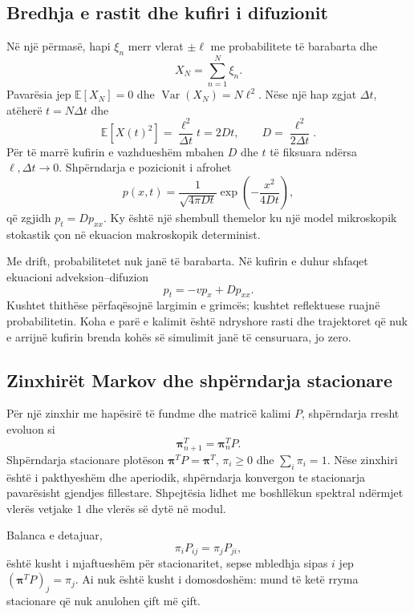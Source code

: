 \documentclass[11pt,oneside,openany]{book}
\newcommand{\vect}[1]{\bm{#1}}
\newcommand{\E}{\mathbb{E}}
\newcommand{\Var}{\operatorname{Var}}
\begin{document}
\subsection{Bredhja e rastit dhe kufiri i difuzionit}
Në një përmasë, hapi $\xi_n$ merr vlerat $\pm\ell$ me probabilitete të barabarta dhe
\begin{equation}
 X_N=\sum_{n=1}^{N}\xi_n.
\end{equation}
Pavarësia jep $\E[X_N]=0$ dhe $\Var(X_N)=N\ell^2$. Nëse një hap zgjat $\Delta t$, atëherë $t=N\Delta t$ dhe
\begin{equation}
 \E[X(t)^2]=\frac{\ell^2}{\Delta t}t=2Dt,
 \qquad D=\frac{\ell^2}{2\Delta t}.
\end{equation}
Për të marrë kufirin e vazhdueshëm mbahen $D$ dhe $t$ të fiksuara ndërsa $\ell,\Delta t\to0$. Shpërndarja e pozicionit i afrohet
\begin{equation}
 p(x,t)=\frac{1}{\sqrt{4\pi Dt}}\exp\left(-\frac{x^2}{4Dt}\right),
\end{equation}
që zgjidh $p_t=Dp_{xx}$. Ky është një shembull themelor ku një model mikroskopik stokastik çon në ekuacion makroskopik determinist.

Me drift, probabilitetet nuk janë të barabarta. Në kufirin e duhur shfaqet ekuacioni adveksion--difuzion
\begin{equation}
 p_t=-v p_x+Dp_{xx}.
\end{equation}
Kushtet thithëse përfaqësojnë largimin e grimcës; kushtet reflektuese ruajnë probabilitetin. Koha e parë e kalimit është ndryshore rasti dhe trajektoret që nuk e arrijnë kufirin brenda kohës së simulimit janë të censuruara, jo zero.

\subsection{Zinxhirët Markov dhe shpërndarja stacionare}
Për një zinxhir me hapësirë të fundme dhe matricë kalimi $P$, shpërndarja rresht evoluon si
\begin{equation}
 \vect\pi_{n+1}^T=\vect\pi_n^TP.
\end{equation}
Shpërndarja stacionare plotëson $\vect\pi^TP=\vect\pi^T$, $\pi_i\ge0$ dhe $\sum_i\pi_i=1$. Nëse zinxhiri është i pakthyeshëm dhe aperiodik, shpërndarja konvergon te stacionarja pavarësisht gjendjes fillestare. Shpejtësia lidhet me boshllëkun spektral ndërmjet vlerës vetjake $1$ dhe vlerës së dytë në modul.

Balanca e detajuar,
\begin{equation}
 \pi_iP_{ij}=\pi_jP_{ji},
\end{equation}
është kusht i mjaftueshëm për stacionaritet, sepse mbledhja sipas $i$ jep $(\vect\pi^TP)_j=\pi_j$. Ai nuk është kusht i domosdoshëm: mund të ketë rryma stacionare që nuk anulohen çift më çift.
\end{document}
